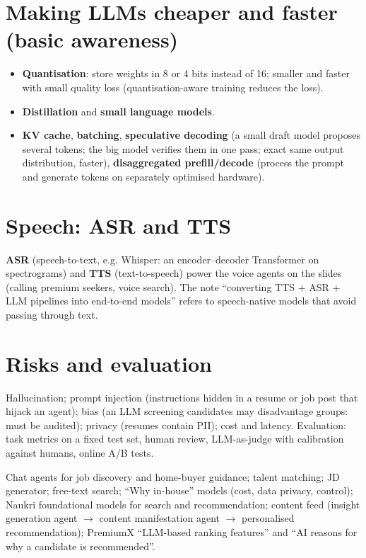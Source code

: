 \section{Making LLMs cheaper and faster (basic awareness)}
\begin{itemize}
\item \textbf{Quantisation}: store weights in 8 or 4 bits instead of 16; smaller and faster with small quality loss (quantisation-aware training reduces the loss).
\item \textbf{Distillation} and \textbf{small language models}.
\item \textbf{KV cache}, \textbf{batching}, \textbf{speculative decoding} (a small draft model proposes several tokens; the big model verifies them in one pass; exact same output
  distribution, faster), \textbf{disaggregated prefill/decode} (process the prompt and generate tokens on separately optimised hardware).
\end{itemize}

\section{Speech: ASR and TTS}
\textbf{ASR} (speech-to-text, e.g. Whisper: an encoder--decoder Transformer on spectrograms) and \textbf{TTS} (text-to-speech) power the voice agents on the slides (calling
premium seekers, voice search). The note ``converting TTS + ASR + LLM pipelines into end-to-end models'' refers to speech-native models that avoid passing through text.

\section{Risks and evaluation}
Hallucination; prompt injection (instructions hidden in a resume or job post that hijack an agent); bias (an LLM screening candidates may disadvantage groups: must be audited);
privacy (resumes contain PII); cost and latency. Evaluation: task metrics on a fixed test set, human review, LLM-as-judge with calibration against humans, online A/B tests.

\begin{practical}
Chat agents for job discovery and home-buyer guidance; talent matching; JD generator; free-text search; ``Why in-house'' models (cost, data privacy, control); Naukri
foundational models for search and recommendation; content feed (insight generation agent $\to$ content manifestation agent $\to$ personalised recommendation);
PremiumX ``LLM-based ranking features'' and ``AI reasons for why a candidate is recommended''.
\end{practical}

